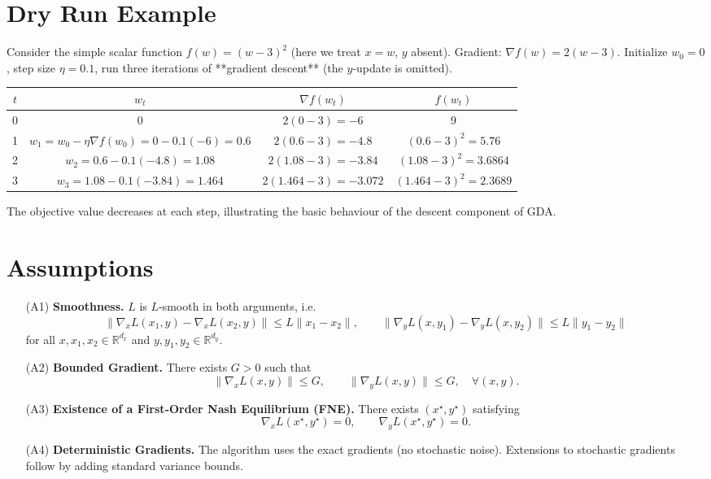 \documentclass{article}
\begin{document}
\section*{Dry Run Example}
Consider the simple scalar function $f(w)=(w-3)^2$ (here we treat $x=w$, $y$ absent).  
Gradient: $\nabla f(w)=2(w-3)$.  
Initialize $w_0=0$, step size $\eta=0.1$, run three iterations of **gradient descent** (the $y$‑update is omitted).

\begin{center}
\begin{tabular}{c|c|c|c}
$t$ & $w_t$ & $\nabla f(w_t)$ & $f(w_t)$\\ \hline
0 & $0$ & $2(0-3)=-6$ & $9$\\
1 & $w_1=w_0-\eta\nabla f(w_0)=0-0.1(-6)=0.6$ & $2(0.6-3)=-4.8$ & $(0.6-3)^2=5.76$\\
2 & $w_2=0.6-0.1(-4.8)=1.08$ & $2(1.08-3)=-3.84$ & $(1.08-3)^2=3.6864$\\
3 & $w_3=1.08-0.1(-3.84)=1.464$ & $2(1.464-3)=-3.072$ & $(1.464-3)^2=2.3689$
\end{tabular}
\end{center}
The objective value decreases at each step, illustrating the basic behaviour of the descent component of GDA.

\newpage
\section*{Assumptions}
\begin{enumerate}
\item[(A1)] \textbf{Smoothness.} $L$ is $L$‑smooth in both arguments, i.e.
\[
\|\nabla_x L(x_1,y)-\nabla_x L(x_2,y)\|\le L\|x_1-x_2\|,
\qquad
\|\nabla_y L(x,y_1)-\nabla_y L(x,y_2)\|\le L\|y_1-y_2\|
\]
for all $x,x_1,x_2\in\mathbb{R}^{d_x}$ and $y,y_1,y_2\in\mathbb{R}^{d_y}$.
\item[(A2)] \textbf{Bounded Gradient.} There exists $G>0$ such that
\[
\|\nabla_x L(x,y)\|\le G,\qquad \|\nabla_y L(x,y)\|\le G,\quad\forall (x,y).
\]
\item[(A3)] \textbf{Existence of a First‑Order Nash Equilibrium (FNE).} There exists $(x^\star,y^\star)$ satisfying
\[
\nabla_x L(x^\star,y^\star)=0,\qquad \nabla_y L(x^\star,y^\star)=0.
\]
\item[(A4)] \textbf{Deterministic Gradients.} The algorithm uses the exact gradients (no stochastic noise). Extensions to stochastic gradients follow by adding standard variance bounds.
\end{enumerate}
\end{document}
